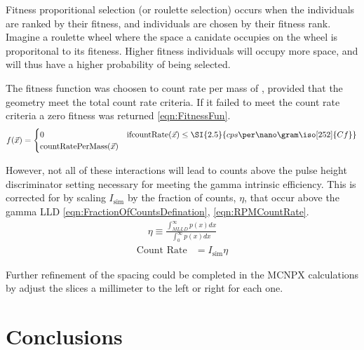Fitness proporitional selection (or roulette selection) occurs when the individuals are ranked by their fitness, and individuals are chosen by their fitness rank.
Imagine a roulette wheel where the space a canidate occupies on the wheel is proporitonal to its fiteness.  
Higher fitness individuals will occupy more space, and will thus have a higher probability of being selected.


The fitness function was choosen to count rate per mass of , provided that the geometry meet the total count rate criteria.
If it failed to meet the count rate criteria a zero fitness was returned \eqref{eqn:FitnessFun}.
\begin{align}
    \label{eqn:FitnessFun}
    f(\vec{x})
    = \begin{cases}
    0 & \text{if} \text{countRate}(\vec{x}) \leq \SI{2.5}{cps\per\nano\gram\iso[252]{Cf}} \\
    \text{countRatePerMass}(\vec{x})
    \end{cases}
\end{align}



However, not all of these interactions will lead to counts above the pulse height discriminator setting necessary for meeting the gamma intrinsic efficiency.
This is corrected for by scaling $I_{\text{sim}}$ by the fraction of counts, $\eta$, that occur above the gamma LLD \eqref{eqn:FractionOfCountsDefination}, \eqref{eqn:RPMCountRate}.
\begin{align}
  \label{eqn:FractionOfCountsDefination}
  \eta \equiv \frac{\int_{MLLD}^\infty p(x)dx}{\int_0^\infty p(x)dx}
\end{align}
\begin{align}
 \label{eqn:RPMCountRate}
 \text{Count Rate} &= I_{\text{sim}} \eta
\end{align}




Further refinement of the spacing could be completed in the MCNPX calculations by adjust the slices a millimeter to the left or right for each one.

\section{Conclusions}

